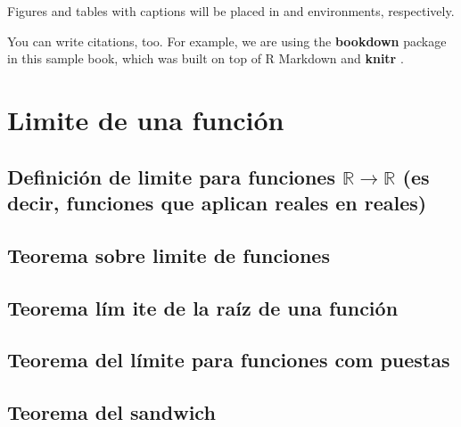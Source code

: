 \documentclass[12pt,]{krantz}
\theoremstyle{definition}
\theoremstyle{definition}
\theoremstyle{definition}
\theoremstyle{remark}
\begin{document}
Figures and tables with captions will be placed in and environments, respectively.

You can write citations, too. For example, we are using the \textbf{bookdown} package \citep{R-bookdown} in this sample book, which was built on top of R Markdown and \textbf{knitr} \citep{xie2015}.

\hypertarget{limite-de-una-funciuxf3n}{%
\chapter{Limite de una función}\label{limite-de-una-funciuxf3n}}

\hypertarget{definiciuxf3n-de-limite-para-funciones-mathbbrto-mathbbr-es-decir-funciones-que-aplican-reales-en-reales}{%
\section{\texorpdfstring{Definición de limite para funciones \(\mathbb{R}\to \mathbb{R}\) (es decir, funciones que aplican reales en reales)}{Definición de limite para funciones \textbackslash{}mathbb\{R\}\textbackslash{}to \textbackslash{}mathbb\{R\} (es decir, funciones que aplican reales en reales)}}\label{definiciuxf3n-de-limite-para-funciones-mathbbrto-mathbbr-es-decir-funciones-que-aplican-reales-en-reales}}

\hypertarget{teorema-sobre-limite-de-funciones}{%
\section{Teorema sobre limite de funciones}\label{teorema-sobre-limite-de-funciones}}

\hypertarget{teorema-luxedm-ite-de-la-rauxedz-de-una-funciuxf3n}{%
\section{Teorema lím ite de la raíz de una función}\label{teorema-luxedm-ite-de-la-rauxedz-de-una-funciuxf3n}}

\hypertarget{teorema-del-luxedmite-para-funciones-com-puestas}{%
\section{Teorema del límite para funciones com puestas}\label{teorema-del-luxedmite-para-funciones-com-puestas}}

\hypertarget{teorema-del-sandwich}{%
\section{Teorema del sandwich}\label{teorema-del-sandwich}}
\end{document}

